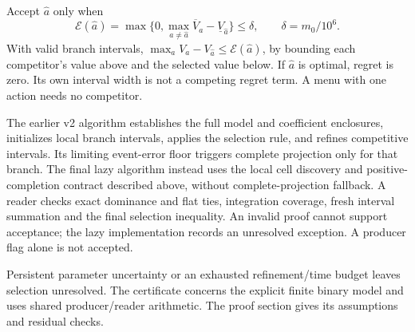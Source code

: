 Accept $\hat a$ only when
\begin{equation}
\mathcal E(\hat a)=
\max\{0,\max_{a\ne\hat a}\overline V_a-\underline V_{\hat a}\}
\le\delta,\qquad \delta=m_0/10^6.                 \label{eq:positive_selection}
\end{equation}
With valid branch intervals, $\max_a V_a-V_{\hat a}\le\mathcal E(\hat a)$, by bounding each competitor's value above and the selected value below. If $\hat a$ is optimal, regret is zero. Its own interval width is not a competing regret term. A menu with one action needs no competitor.

The earlier v2 algorithm establishes the full model and coefficient enclosures, initializes local branch intervals, applies the selection rule, and refines competitive intervals. Its limiting event-error floor triggers complete projection only for that branch. The final lazy algorithm instead uses the local cell discovery and positive-completion contract described above, without complete-projection fallback. A reader checks exact dominance and flat ties, integration coverage, fresh interval summation and the final selection inequality. An invalid proof cannot support acceptance; the lazy implementation records an unresolved exception. A producer flag alone is not accepted.

Persistent parameter uncertainty or an exhausted refinement/time budget leaves selection unresolved. The certificate concerns the explicit finite binary model and uses shared producer/reader arithmetic. The proof section gives its assumptions and residual checks.
